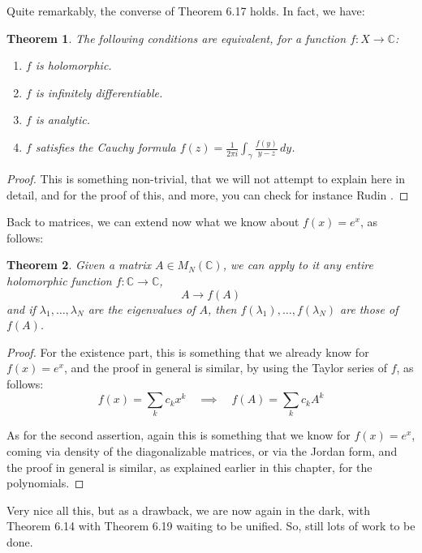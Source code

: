 \documentclass[12pt]{amsbook}
\newtheorem{theorem}{Theorem}[chapter]
\begin{document}
Quite remarkably, the converse of Theorem 6.17 holds. In fact, we have:


\begin{theorem}
The following conditions are equivalent, for a function $f:X\to\mathbb C$:
\begin{enumerate}
\item $f$ is holomorphic.

\item $f$ is infinitely differentiable.

\item $f$ is analytic.

\item $f$ satisfies the Cauchy formula $f(z)=\frac{1}{2\pi i}\int_\gamma\frac{f(y)}{y-z}\,dy$.
\end{enumerate}
\end{theorem}

\begin{proof}
This is something non-trivial, that we will not attempt to explain here in detail, and for the proof of this, and more, you can check for instance Rudin \cite{ru2}.
\end{proof}

Back to matrices, we can extend now what we know about $f(x)=e^x$, as follows:

\begin{theorem}
Given a matrix $A\in M_N(\mathbb C)$, we can apply to it any entire holomorphic function $f:\mathbb C\to\mathbb C$,
$$A\to f(A)$$
and if $\lambda_1,\ldots,\lambda_N$ are the eigenvalues of $A$, then $f(\lambda_1),\ldots,f(\lambda_N)$ are those of $f(A)$.
\end{theorem}

\begin{proof}
For the existence part, this is something that we already know for $f(x)=e^x$, and the proof in general is similar, by using the Taylor series of $f$, as follows:
$$f(x)=\sum_kc_kx^k\quad\implies\quad f(A)=\sum_kc_kA^k$$

 As for the second assertion, again this is something that we know for $f(x)=e^x$, coming via density of the diagonalizable matrices, or via the Jordan form, and the proof in general is similar, as explained earlier in this chapter, for the polynomials.
\end{proof}

Very nice all this, but as a drawback, we are now again in the dark, with Theorem 6.14 with Theorem 6.19 waiting to be unified. So, still lots of work to be done.
\end{document}
